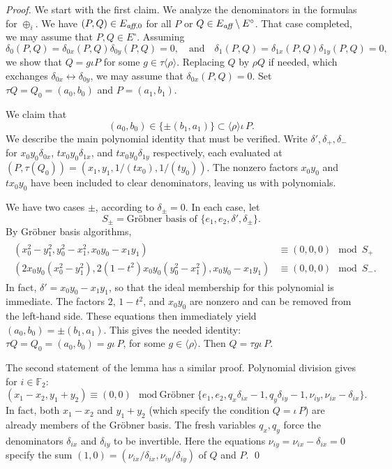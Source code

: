 \documentclass{llncs}
\newcommand{\ring}[1]{\mathbb{#1}}
\newcommand{\op}[1]{\hbox{#1}}
\newcommand{\Eaff}{E_{\op{\scriptsize\it aff}}}
\newcommand{\Eaf}[1]{E_{\op{\scriptsize\it aff},{#1}}}
\newcommand{\Eoo}{E^{\circ}} %
\newcommand{\Go}{\langle\rho\rangle}
\newcommand{\ang}[1]{\langle{#1}\rangle}
\begin{document}
\begin{proof}  
We start with the first claim.
We analyze the denominators in the formulas for $\oplus_i$.  
We have $(P,Q)\in\Eaf{0}$ for all $P$ or $Q\in \Eaff\setminus\Eoo$.
That case completed,  we may assume that $P,Q\in \Eoo$.
  Assuming
  \[
  \delta_0(P,Q) = \delta_{0x}(P,Q)\delta_{0y}(P,Q)=0,\quad\text{and}\quad
  \delta_1(P,Q) = \delta_{1x}(P,Q)\delta_{1y}(P,Q)=0,
  \]
  we show that $Q = g \iota P$ for some $g\in \tau\ang{\rho}$.
  Replacing $Q$ by $\rho Q$ if needed, which exchanges
  $\delta_{0x}\leftrightarrow \delta_{0y}$, we may assume that
  $\delta_{0x}(P,Q)=0$.  Set $\tau Q = Q_0 = (a_0,b_0)$ and
  $P=(a_1,b_1)$.  

We claim that
\begin{equation}\label{eqn:gp-}
(a_0,b_0) \in \{\pm (b_1,a_1)\} \subset \Go\iota\,P.
\end{equation}
We describe
the main polynomial identity that must be verified.
Write $\delta',\delta_{+},\delta_{-}$ for $x_0 y_0\delta_{0x}$, $t x_0
y_0\delta_{1x}$, and $t x_0 y_0 \delta_{1y}$ respectively, each
evaluated at $(P,\tau(Q_0))=(x_1,y_1,1/(t x_0),1/(t y_0))$.  The
nonzero factors $x_0y_0$ and $t x_0 y_0$ have been included to clear
denominators, leaving us with polynomials.

We have two cases $\pm$, according to $\delta_{\pm}=0$.  In each case,
let
\[
S_\pm = \text{Gr\"obner basis of } \{e_1,e_2, 
\delta',\delta_{\pm} %
\}.
\]
By Gr\"obner basis algorithms,
\begin{align}\label{eqn:dichot}
\begin{split}
(x_0^2-y_1^2, %
 y_0^2-x_1^2, %
 x_0 y_0 - x_1 y_1 %
) &\equiv (0,0,0) \mod S_+\\
(2 x_0 y_0 (x_0^2-y_1^2), %
2 (1-t^2) x_0 y_0 (y_0^2-x_1^2), %
x_0 y_0 - x_1 y_1 %
) &\equiv (0,0,0) \mod S_-.
\end{split}
\end{align}
In fact, $\delta' = x_0 y_0-x_1 y_1$, so that the ideal membership for
this polynomial is immediate.  The factors $2$, $1-t^2$, and $x_0 y_0$
are nonzero and can be removed from the left-hand side.
These equations then immediately yield $(a_0,b_0) = \pm (b_1,a_1)$.  
This gives the needed identity:  $\tau Q =
Q_0 = (a_0,b_0) = g \iota\,P$, for some $g\in \Go$.  Then $Q = \tau g
\iota\,P$.

The second statement of the lemma has a similar proof.  Polynomial
division gives for $i\in \ring{F}_2$:
\[
(x_1-x_2,y_1+y_2)\equiv (0,0) \mod \text{Gr\"obner} 
\{ e_1,e_2,q_x \delta_{ix}-1,q_y \delta_{iy}-1,
\nu_{i y},\nu_{i x}-\delta_{i x} \}.
\]
In fact, both $x_1-x_2$ and $y_1+y_2$ (which specify the condition $Q
=\iota\,P$) are already members of the Gr\"obner basis.  The fresh
variables $q_x,q_y$ force the denominators $\delta_{ix}$ and
$\delta_{iy}$ to be invertible.  Here the equations $\nu_{i y}=\nu_{i
  x}-\delta_{i x}=0$ specify the sum
$(1,0)=(\nu_{ix}/\delta_{ix},\nu_{iy}/\delta_{iy})$ of $Q$ and $P$.
\qed\end{proof}
\end{document}

